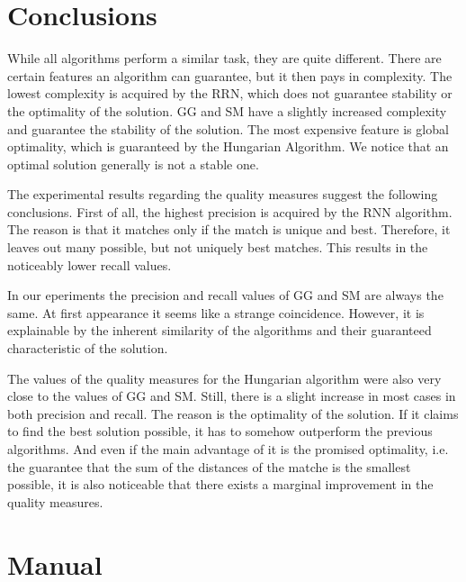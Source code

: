 \documentclass[a4paper,11pt]{article}
\begin{document}
\section{Conclusions}



While all algorithms perform a similar task, they are quite different. There are certain features an algorithm can guarantee, but it then pays in complexity. The lowest complexity is acquired by the RRN, which does not guarantee stability or the optimality of the solution. GG and SM have a slightly increased complexity and guarantee the stability of the solution. The most expensive feature is global optimality, which is guaranteed by the Hungarian Algorithm. We notice that an optimal solution generally is not a stable one.

The experimental results regarding the quality measures suggest the following conclusions. First of all, the highest precision is acquired by the RNN algorithm. The reason is that it matches only if the match is unique and best. Therefore, it leaves out many possible, but not uniquely best matches. This results in the noticeably lower recall values.

In our eperiments the precision and recall values of GG and SM are always the same. At first appearance it seems like a strange coincidence. However, it is explainable by the inherent similarity of the algorithms and their guaranteed characteristic of the solution.

The values of the quality measures for the Hungarian algorithm were also very close to the values of GG and SM. Still, there is a slight increase in most cases in both precision and recall. The reason is the optimality of the solution. If it claims to find the best solution possible, it has to somehow outperform the previous algorithms. And even if the main advantage of it is the promised optimality, i.e. the guarantee that the sum of the distances of the matche is the smallest possible, it is also noticeable that there exists a marginal improvement in the quality measures.

\section{Manual}

\end{document}
